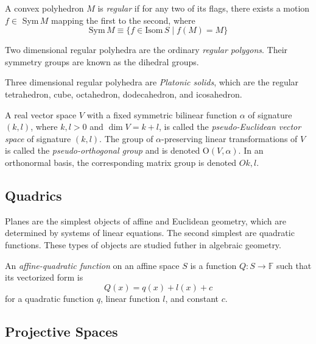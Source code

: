 \documentclass{article}
\begin{document}
    \begin{definition}
      A convex polyhedron $M$ is \textit{regular} if for any two of its flags, there exists a motion $f \in$ Sym$\,M$ mapping the first to the second, where 
      \begin{equation}
        \text{Sym}\,M \equiv \{f \in \text{Isom}\,S \;|\; f(M) = M \}
      \end{equation}
    \end{definition}

    Two dimensional regular polyhedra are the ordinary \textit{regular polygons}. Their symmetry groups are known as the dihedral groups.

    Three dimensional regular polyhedra are \textit{Platonic solids}, which are the regular tetrahedron, cube, octahedron, dodecahedron, and icosahedron. 

    \begin{definition}
      A real vector space $V$ with a fixed symmetric bilinear function $\alpha$ of signature $(k, l)$, where $k, l > 0$ and $\dim{V} = k+l$, is called the \textit{pseudo-Euclidean vector space} of signature $(k, l)$. The group of $\alpha$-preserving linear transformations of $V$ is called the \textit{pseudo-orthogonal group} and is denoted O$(V, \alpha)$. In an orthonormal basis, the corresponding matrix group is denoted $O{k,l}$. 
    \end{definition}

  \subsection{Quadrics}

    Planes are the simplest objects of affine and Euclidean geometry, which are determined by systems of linear equations. The second simplest are quadratic functions. These types of objects are studied futher in algebraic geometry. 

    \begin{definition}
      An \textit{affine-quadratic function} on an affine space $S$ is a function $Q: S \longrightarrow \mathbb{F}$ such that its vectorized form is
      \begin{equation}
        Q(x) = q(x) + l(x) + c
      \end{equation}
      for a quadratic function $q$, linear function $l$, and constant $c$. 
    \end{definition}

  \subsection{Projective Spaces}
\end{document}
